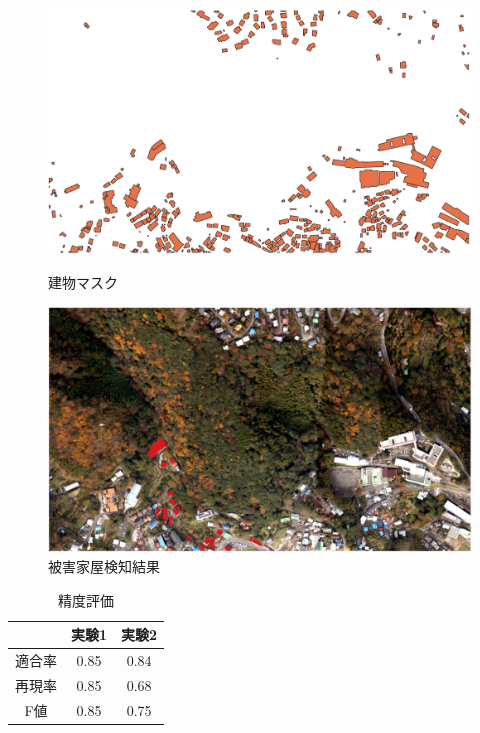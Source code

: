 \documentclass[a4paper, twocolumn, xelatex, 10pt, ja=standard, Ligatures=TeX]{bxjsarticle}
\begin{document}
		\begin{figure}[!h]
			\begin{minipage}{0.48\hsize}
				\centering
				\small
				\includegraphics[width=\linewidth]{img/io_img/BLD_Mask01.png}
				\caption{建物マスク}
				\label{figure_mask}
			\end{minipage}
			\begin{minipage}{0.48\hsize}
				\centering
				\small
				\includegraphics[width=\linewidth]{img/io_img/result01.png}
				\caption{被害家屋検知結果}
				\label{figure_result}
			\end{minipage}
		\end{figure}

		\begin{table}[H]
			\centering
			\caption{精度評価}
			\label{table_seido}
			\small
			\begin{tabular}{ccc}
				 & 実験1 & 実験2\\
				\hline
				適合率 & 0.85 & 0.84\\
				再現率 & 0.85 & 0.68\\
				F値 & 0.85 & 0.75\\
				\hline
			\end{tabular}
		\end{table}
\end{document}
